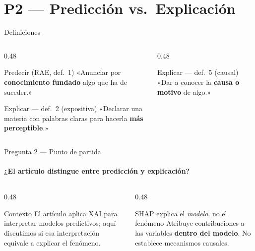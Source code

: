 \documentclass[aspectratio=169,11pt]{beamer}
\begin{document}
\section{P2 — Predicción vs.\ Explicación}

\begin{frame}{Definiciones}
  \begin{columns}[T]
    \begin{column}{0.48\textwidth}
      \begin{exampleblock}{Predecir (RAE, def.\ 1)}
        «Anunciar por \textbf{conocimiento fundado} algo que ha de suceder.»
      \end{exampleblock}
      \vspace{0.4em}
      \begin{exampleblock}{Explicar — def.\ 2 (expositiva)}
        «Declarar una materia con palabras claras para hacerla \textbf{más perceptible}.»
      \end{exampleblock}
    \end{column}
    \begin{column}{0.48\textwidth}
      \begin{alertblock}{Explicar — def.\ 5 (causal)}
        «Dar a conocer la \textbf{causa o motivo} de algo.»
      \end{alertblock}
    \end{column}
  \end{columns}
\end{frame}

\begin{frame}{Pregunta 2 — Punto de partida}
  \framesubtitle{¿El artículo distingue entre predicción y explicación?}
  \begin{columns}[T]
    \begin{column}{0.48\textwidth}
      \begin{block}{Contexto}
        \small
        El artículo aplica XAI para interpretar modelos predictivos; aquí discutimos si esa interpretación equivale a explicar el fenómeno.
      \end{block}
    \end{column}
    \begin{column}{0.48\textwidth}
      \begin{block}{SHAP explica el \textit{modelo}, no el fenómeno}
        Atribuye contribuciones a las variables \textbf{dentro del modelo}.
        No establece mecanismos causales.
      \end{block}
    \end{column}
  \end{columns}
\end{frame}
\end{document}
